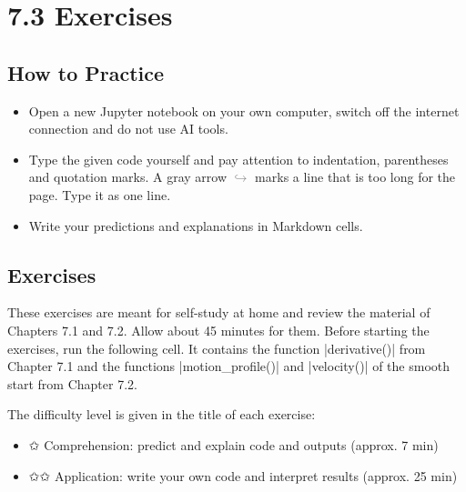 \documentclass[paper=a4, fontsize=11pt, parskip=half]{scrartcl}
\begin{document}
\section*{7.3 Exercises}

\subsection*{How to Practice}

\begin{itemize}[noitemsep]
  \item Open a new Jupyter notebook on your own computer, switch off the
        internet connection and do not use AI tools.
  \item Type the given code yourself and pay attention to indentation,
        parentheses and quotation marks. A gray arrow
        \textcolor{gray}{$\hookrightarrow$} marks a line that is too long for
        the page. Type it as one line.
  \item Write your predictions and explanations in Markdown cells.
\end{itemize}

\subsection*{Exercises}

These exercises are meant for self-study at home and review the material of Chapters 7.1 and 7.2. Allow about 45 minutes for them. Before starting the exercises, run the following cell. It contains the function \py|derivative()| from Chapter 7.1 and the functions \py|motion_profile()| and \py|velocity()| of the smooth start from Chapter 7.2.

The difficulty level is given in the title of each exercise:

\begin{itemize}
  \item ✩ Comprehension: predict and explain code and outputs (approx. 7 min)
  \item ✩✩ Application: write your own code and interpret results (approx. 25 min)
\end{itemize}
\end{document}
